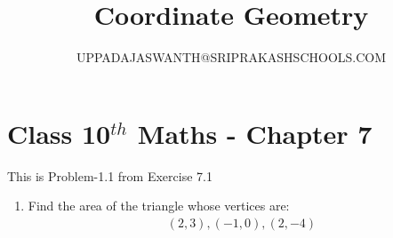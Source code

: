 \documentclass[12pt]{article}
\title{Coordinate Geometry }
\author{UPPADAJASWANTH@SRIPRAKASHSCHOOLS.COM}
\begin{document}
\maketitle
\section*{Class 10$^{th}$ Maths - Chapter 7}
This is Problem-1.1 from Exercise 7.1
\begin{enumerate}
\item {Find the area of the triangle whose vertices are:}
\begin{align}
{(2,3),(-1,0),(2,-4)}
\end{align} 


\end{enumerate}
\end{document}
